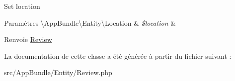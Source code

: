 Set location


\begin{DoxyParams}[1]{Paramètres}
\textbackslash{}\+App\+Bundle\textbackslash{}\+Entity\textbackslash{}\+Location & {\em \$location} & \\
\hline
\end{DoxyParams}
\begin{DoxyReturn}{Renvoie}
\hyperlink{classAppBundle_1_1Entity_1_1Review}{Review} 
\end{DoxyReturn}


La documentation de cette classe a été générée à partir du fichier suivant \+:\begin{DoxyCompactItemize}
\item 
src/\+App\+Bundle/\+Entity/Review.\+php\end{DoxyCompactItemize}

